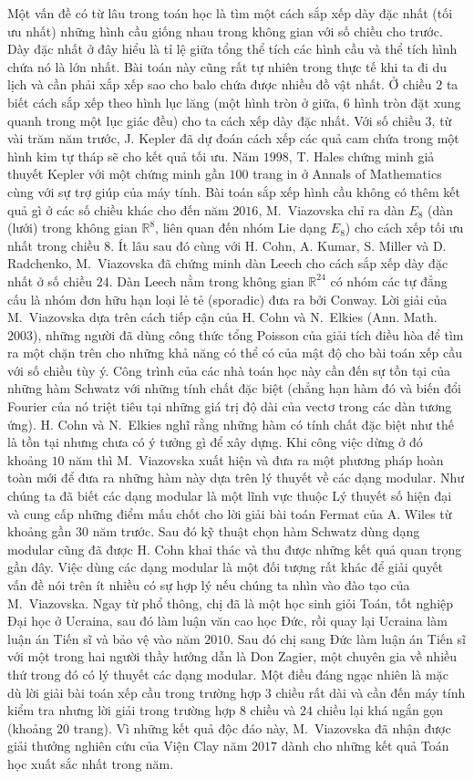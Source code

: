 \begin{multicols}{2}
	Một vấn đề có từ lâu trong toán học là tìm một cách sắp xếp dày đặc nhất (tối ưu nhất) những hình cầu giống nhau trong không gian với số chiều cho trước. Dày đặc nhất ở đây hiểu là tỉ lệ giữa tổng thể tích các hình cầu và thể tích hình chứa nó là lớn nhất. Bài toán này cũng rất tự nhiên trong thực tế khi ta đi du lịch và cần phải xắp xếp sao cho balo chứa được nhiều đồ vật nhất. Ở chiều $2$ ta biết cách sắp xếp theo hình lục lăng (một hình tròn ở giữa, $6$ hình tròn đặt xung quanh trong một lục giác đều) cho ta cách xếp dày đặc nhất. Với số chiều $3$, từ vài trăm năm trước, J. Kepler đã dự đoán cách xếp các quả cam chứa trong một hình kim tự tháp sẽ cho kết quả tối ưu. Năm $1998$, T. Hales chứng minh giả thuyết Kepler với một chứng minh gần $100$ trang in ở Annals of Mathematics cùng với sự trợ giúp của máy tính. Bài toán sắp xếp hình cầu không có thêm kết quả gì ở các số chiều khác cho đến năm $2016$, M.~Viazovska chỉ ra dàn $E_{8}$ (dàn (lưới) trong không gian $\mathbb{R}^8$, liên quan đến nhóm Lie dạng $E_{8}$) cho cách xếp tối ưu nhất trong chiều $8$. Ít lâu sau đó cùng với H. Cohn, A. Kumar, S. Miller và D. Radchenko, M.~Viazovska đã chứng minh dàn Leech cho cách sắp xếp dày đặc nhất ở số chiều $24$. Dàn Leech nằm trong không gian $\mathbb{R}^{24}$ có nhóm các tự đẳng cấu là nhóm đơn hữu hạn loại lẻ tẻ (sporadic) đưa ra bởi Conway. Lời giải của M.~Viazovska dựa trên cách tiếp cận của H. Cohn và N.~Elkies (Ann. Math. $2003$), những người đã dùng công thức tổng Poisson của giải tích điều hòa để tìm ra một chặn trên cho những khả năng có thể có của mật độ cho bài toán xếp cầu với số chiều tùy ý. Công trình của các nhà toán học này cần đến sự tồn tại của những hàm Schwatz với những tính chất đặc biệt (chẳng hạn hàm đó và biến đổi Fourier của nó triệt tiêu tại những giá trị độ dài của vectơ trong các dàn tương ứng). H. Cohn và N.~Elkies nghĩ rằng những hàm có tính chất đặc biệt như thế là tồn tại nhưng chưa có ý tưởng gì để xây dựng. Khi công việc dừng ở đó khoảng $10$ năm thì M.~Viazovska xuất hiện và đưa ra một phương pháp hoàn toàn mới để đưa ra những hàm này dựa trên lý thuyết về các dạng modular. Như chúng ta đã biết các dạng modular là một lĩnh vực thuộc Lý thuyết số hiện đại và cung cấp những điểm mấu chốt cho lời giải bài toán Fermat của A. Wiles từ khoảng gần $30$ năm trước. Sau đó kỹ thuật chọn hàm Schwatz dùng dạng modular cũng đã được H. Cohn khai thác và thu được những kết quả quan trọng gần đây. Việc dùng các dạng modular là một đối tượng rất khác để giải quyết vấn đề nói trên ít nhiều có sự hợp lý nếu chúng ta nhìn vào đào tạo của M.~Viazovska. Ngay từ phổ thông, chị đã là một học sinh giỏi Toán, tốt nghiệp Đại học ở Ucraina, sau đó làm luận văn cao học Đức, rồi quay lại Ucraina làm luận án Tiến sĩ và bảo vệ vào năm $2010$. Sau đó chị sang Đức làm luận án Tiến sĩ với một trong hai người thầy hướng dẫn là Don Zagier, một chuyên gia về nhiều thứ trong đó có lý thuyết các dạng modular. Một điều đáng ngạc nhiên là mặc dù lời giải bài toán xếp cầu trong trường hợp $3$ chiều rất dài và cần đến máy tính kiểm tra nhưng lời giải trong trường hợp $8$ chiều và $24$ chiều lại khá ngắn gọn (khoảng $20$ trang). Vì những kết quả độc đáo này, M.~Viazovska đã nhận được giải thưởng nghiên cứu của Viện Clay năm $2017$ dành cho những kết quả Toán học xuất sắc nhất trong năm.        

\end{multicols}
